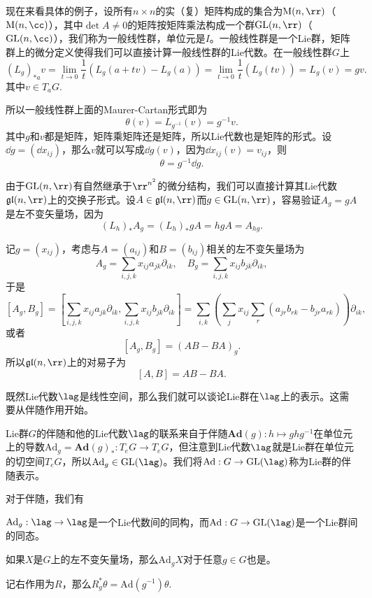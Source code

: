 现在来看具体的例子，设所有$n\times n$的实（复）矩阵构成的集合为$\mathrm{M}(n,\rr)$（$\mathrm{M}(n,\cc)$），其中$\det A\neq 0$的矩阵按矩阵乘法构成一个群$\mathrm{GL}(n,\rr)$（$\mathrm{GL}(n,\cc)$），我们称为一般线性群，单位元是$I$。一般线性群是一个Lie群，矩阵群上的微分定义使得我们可以直接计算一般线性群的Lie代数。在一般线性群$G$上
\[
	(L_g)_{*a}v=\lim_{t\to 0}\frac{1}{t}(L_g(a+tv)-L_g(a))=\lim_{t\to 0}\frac{1}{t}(L_g(tv))=L_g(v)=gv.
\]
其中$v\in T_aG$.

所以一般线性群上面的Maurer-Cartan形式即为
\[
	\theta(v)=L_{g^{-1}}(v)=g^{-1}v.
\]
其中$g$和$v$都是矩阵，矩阵乘矩阵还是矩阵，所以Lie代数也是矩阵的形式。设$\dd g=(\dd x_{ij})$，那么$v$就可以写成$\dd g(v)$，因为$\dd x_{ij}(v)=v_{ij}$，则
\[
	\theta=g^{-1}\dd g.
\]

由于$\mathrm{GL}(n,\rr)$有自然继承于$\rr^{n^2}$的微分结构，我们可以直接计算其Lie代数$\mathfrak{gl}(n,\rr)$上的交换子形式。设$A\in\mathfrak{gl}(n,\rr)$而$g\in\mathrm{GL}(n,\rr)$，容易验证$A_g=gA$是左不变矢量场，因为
\[
	(L_h)_{*}A_g=(L_h)_{*}gA=hgA=A_{hg}.
\]

记$g=(x_{ij})$，考虑与$A=(a_{ij})$和$B=(b_{ij})$相关的左不变矢量场为
\[
A_g=\sum_{i,j,k}x_{ij}a_{jk}\partial_{ik},\quad B_g=\sum_{i,j,k}x_{ij}b_{jk}\partial_{ik},
\]
于是
\[
[A_g,B_g]=\left[\sum_{i,j,k}x_{ij}a_{jk}\partial_{ik},\sum_{i,j,k}x_{ij}b_{jk}\partial_{ik}\right]=\sum_{i,k}\left(\sum_{j}x_{ij}\sum_{r}(a_{jr}b_{rk}-b_{jr}a_{rk})\right)\partial_{ik},
\]
或者
\[
[A_g,B_g]=(AB-BA)_g.
\]
所以$\mathfrak{gl}(n,\rr)$上的对易子为
\[
[A,B]=AB-BA.
\]

既然Lie代数$\lag$是线性空间，那么我们就可以谈论Lie群在$\lag$上的表示。这需要从伴随作用开始。

Lie群$G$的伴随和他的Lie代数$\lag$的联系来自于伴随$\mathbf{Ad}(g):h\mapsto ghg^{-1}$在单位元上的导数$\mathrm{Ad}_g=\mathbf{Ad}(g)_*:T_eG\to T_eG$，但注意到Lie代数$\lag$就是Lie群在单位元的切空间$T_eG$，所以$\mathrm{Ad}_g\in \mathrm{GL}(\lag)$。我们将$\mathrm{Ad}:G\to \mathrm{GL}(\lag)$称为Lie群的伴随表示。

\begin{pro}对于伴随，我们有

 $\mathrm{Ad}_g:\lag\to \lag$是一个Lie代数间的同构，而$\mathrm{Ad}:G\to \mathrm{GL}(\lag)$是一个Lie群间的同态。

 如果$X$是$G$上的左不变矢量场，那么$\mathrm{Ad}_gX$对于任意$g\in G$也是。

 记右作用为$R$，那么$R_g^*\theta=\mathrm{Ad}(g^{-1})\theta$.
\end{pro}


